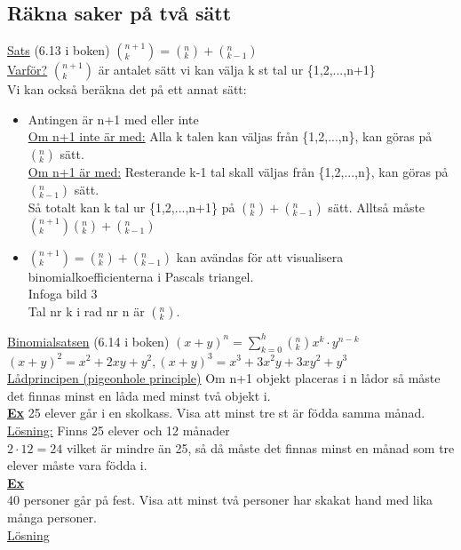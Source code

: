 \documentclass{article}
\begin{document}
    \subsection{Räkna saker på två sätt}
    \underline{Sats} (6.13 i boken) $(^{n+1}_{k})=(^{n}_{k})+(^{n}_{k-1})$\\
    \underline{Varför?} $(^{n+1}_{k})$ är antalet sätt vi kan välja k st tal ur \{1,2,...,n+1\}\\
    Vi kan också beräkna det på ett annat sätt:
    \begin{itemize}
        \item Antingen är n+1 med eller inte\\
            \underline{Om n+1 inte är med:} Alla k talen kan väljas från \{1,2,...,n\}, kan göras på $(^{n}_{k})$ sätt.\\
            \underline{Om n+1 är med:} Resterande k-1 tal skall väljas från \{1,2,...,n\}, kan göras på $(^{n}_{k-1})$ sätt.\\
            Så totalt kan k tal ur \{1,2,...,n+1\} på $(^{n}_{k})+(^{n}_{k-1})$ sätt. Alltså måste $(^{n+1}_{k})(^{n}_{k})+(^{n}_{k-1})$
        \item $(^{n+1}_{k})=(^{n}_{k})+(^{n}_{k-1})$ kan avändas för att visualisera binomialkoefficienterna i Pascals triangel.\\Infoga bild 3\\
            Tal nr k i rad nr n är $(^{n}_{k})$.
    \end{itemize}
    \underline{Binomialsatsen} (6.14 i boken) $(x+y)^{n}=\sum_{k=0}^{h}(_{k}^{n})x^{k}\cdot y^{n-k}$\\
    \indent $(x+y)^{2}=x^{2}+2xy+y^{2}, (x+y)^{3}=x^{3}+3x^{2}y+3xy^{2}+y^{3}$\\
    \underline{Lådprincipen (pigeonhole principle)} Om n+1 objekt placeras i n lådor så måste det finnas minst en låda med minst två objekt i.\\
    \underline{\textbf{Ex}} 25 elever går i en skolkass. Visa att minst tre st är födda samma månad.\\
    \underline{Lösning:} Finns 25 elever och 12 månader\\
    $2\cdot 12=24$ vilket är mindre än 25, så då måste det finnas minst en månad som tre elever måste vara födda i.\\
    \underline{\textbf{Ex}}\\
    40 personer går på fest. Visa att minst två personer har skakat hand med lika många personer.\\
    \underline{Lösning}\\
\end{document}
